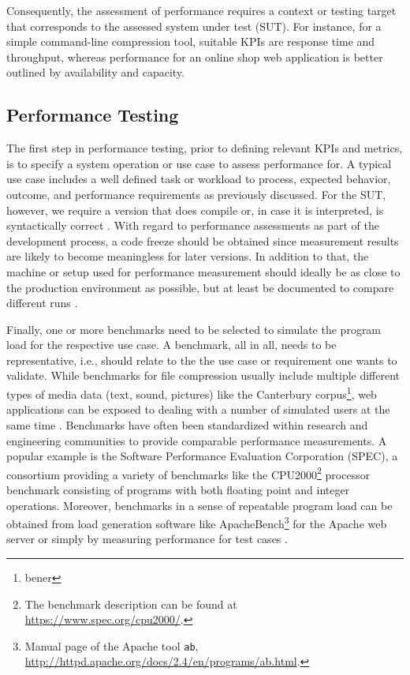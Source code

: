 Consequently, the assessment of performance requires a context or testing
target that corresponds to the assessed system under test (SUT). For instance,
for a simple command-line compression tool, suitable KPIs are response time and
throughput, whereas performance for an online shop web application is better
outlined by availability and capacity.

\subsection{Performance Testing}
The first step in performance testing, prior to defining relevant KPIs and
metrics, is to specify a system operation or use case \citep{woodside_future_2007} to
assess performance for. A typical use case includes a well defined task or
workload to process, expected behavior, outcome, and performance
requirements as previously discussed. For the SUT, however, we require a
version that does compile or, in case it is interpreted, is syntactically
correct \citep{molyneaux_art_2014}. With regard to performance assessments as part of
the development process, a code freeze should be obtained since measurement
results are likely to become meaningless for later versions. In addition to
that,  the machine or setup used for performance measurement should ideally be
as close to the production environment as possible, but at least be documented
to compare different runs \citep{molyneaux_art_2014}.

Finally, one or more benchmarks need to be selected to simulate  the program
load for the respective use case. A benchmark, all in all, needs to be
representative, i.e., should relate to the the use case or requirement one
 wants to validate. While benchmarks for file compression usually include
multiple different types of media data (text, sound, pictures) like the
{\color{blue}Canterbury corpus\footnote{bener}}, web applications can be exposed
to dealing with a number of simulated users at the same time \citep{molyneaux_art_2014}. Benchmarks have often been
standardized within research and engineering communities to provide comparable
performance measurements. A popular example is the Software Performance Evaluation
Corporation (SPEC), a consortium providing a variety of benchmarks like the
CPU2000\footnote{The benchmark description
can be found at \url{https://www.spec.org/cpu2000/}.} processor benchmark
consisting of programs with both floating point and integer operations.
Moreover, benchmarks in a sense of repeatable program load can be obtained from
load generation software like ApacheBench\footnote{Manual page of the Apache
tool \texttt{ab}, \url{http://httpd.apache.org/docs/2.4/en/programs/ab.html}.}
for the Apache web server or simply by measuring performance for test cases
\citep{heger_automated_2013,nguyen_industrial_2014}.

